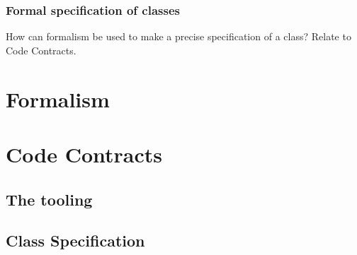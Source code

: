 

\begin{frame}
    \frametitle{Formal specification of classes}

    How can formalism be used to make a precise specification of a class?
    Relate to Code Contracts.
\end{frame}

\section{Formalism}



\section{Code Contracts}

\subsection{The tooling}



\subsection{Class Specification}




